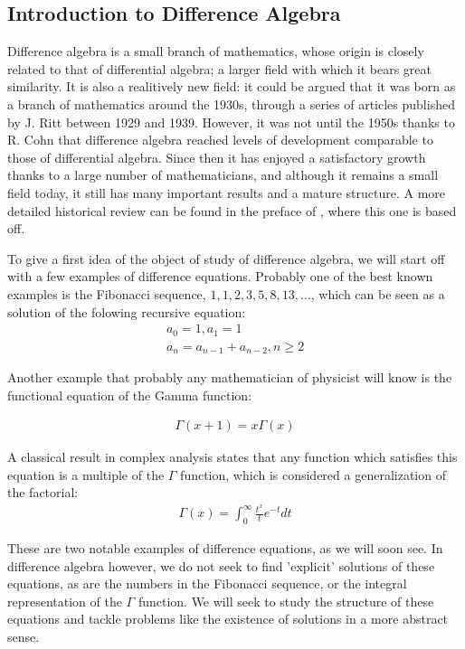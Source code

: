 
\subsection{Introduction to Difference Algebra} 

Difference algebra is a small branch of mathematics, whose origin is closely related to that of differential algebra; a larger field with which it bears great similarity. It is also a realitively new field:
it could be argued that it was born as a branch of mathematics around the 1930s, through a series of articles published by J. Ritt between 1929 and 1939. However, it was not until the 1950s thanks to R. Cohn 
that difference algebra reached levels of development comparable to those of differential algebra.  Since then it has enjoyed a satisfactory growth thanks to a large number of mathematicians, and although it remains a small field today,
it still has many important results and a mature structure. A more detailed historical review can be found in the preface of \cite{levin}, where this one is based off.


To give a first idea of the object of study of difference algebra, we will start off with a few examples of difference equations. Probably one of the best known examples is the Fibonacci sequence, $1,1,2,3,5,8,13,\ldots$, which can be seen as a solution of the folowing recursive equation:
\begin{align*}
a_0 = 1,  a_1 = 1 \\ a_n = a_{n-1} + a_{n-2}, n\geq 2
\end{align*}

Another example that probably any mathematician of physicist will know is the functional equation of the Gamma function:

\begin{align*}
\Gamma(x+1) = x \Gamma(x)
\end{align*}

A classical result in complex analysis states that any function which satisfies this equation is a multiple of the $\Gamma$ function,
which is considered a generalization of the factorial:
\begin{align*}
\Gamma(x) = \int_0^\infty{\frac{t^x}{t} e^{-t} dt}
\end{align*}

These are two notable examples of difference equations, as we will soon see. In difference algebra however, we do not seek to find 'explicit' solutions of these equations,
 as are the numbers in the Fibonacci sequence, or the integral representation of the $\Gamma$ function. We will seek to study the structure of these equations and tackle problems like the existence of solutions in a more abstract sense.

